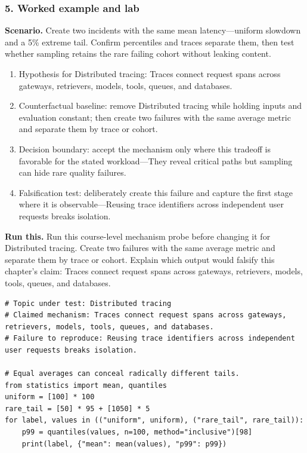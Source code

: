 \subsubsection*{5. Worked example and lab}
\textbf{Scenario.} Create two incidents with the same mean latency—uniform slowdown and a 5\% extreme tail. Confirm percentiles and traces separate them, then test whether sampling retains the rare failing cohort without leaking content.
\begin{enumerate}
\item Hypothesis for Distributed tracing: Traces connect request spans across gateways, retrievers, models, tools, queues, and databases.
\item Counterfactual baseline: remove Distributed tracing while holding inputs and evaluation constant; then create two failures with the same average metric and separate them by trace or cohort.
\item Decision boundary: accept the mechanism only where this tradeoff is favorable for the stated workload—They reveal critical paths but sampling can hide rare quality failures.
\item Falsification test: deliberately create this failure and capture the first stage where it is observable—Reusing trace identifiers across independent user requests breaks isolation.
\end{enumerate}
\textbf{Run this.} Run this course-level mechanism probe before changing it for Distributed tracing. Create two failures with the same average metric and separate them by trace or cohort. Explain which output would falsify this chapter's claim: Traces connect request spans across gateways, retrievers, models, tools, queues, and databases.
\begin{Verbatim}[fontsize=\scriptsize]
# Topic under test: Distributed tracing
# Claimed mechanism: Traces connect request spans across gateways, retrievers, models, tools, queues, and databases.
# Failure to reproduce: Reusing trace identifiers across independent user requests breaks isolation.

# Equal averages can conceal radically different tails.
from statistics import mean, quantiles
uniform = [100] * 100
rare_tail = [50] * 95 + [1050] * 5
for label, values in (("uniform", uniform), ("rare_tail", rare_tail)):
    p99 = quantiles(values, n=100, method="inclusive")[98]
    print(label, {"mean": mean(values), "p99": p99})
\end{Verbatim}
